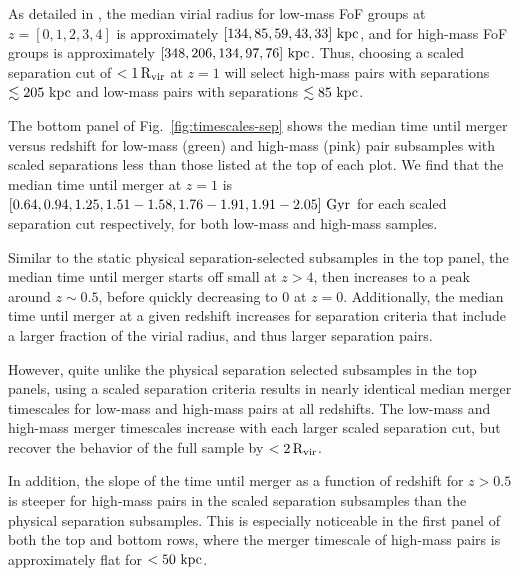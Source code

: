 \documentclass[twocolumn,linenumbers]{aastex631}
\newcommand{\kc}[1]{\textcolor{yellow}{\textbf{kc: #1}} }
\newcommand{\chambe}{\citet{Chamberlain2024}}
\begin{document}
        As detailed in \chambe{}, the median virial radius for low-mass FoF groups at $z=[0,1,2,3,4]$ is approximately $[134, 85, 59, 43, 33]\,\mathrm{\,kpc}$, and for high-mass FoF groups is approximately $[348, 206, 134, 97, 76]\,\mathrm{\,kpc}$.
        Thus, choosing a scaled separation cut of $<1\,\rm R_{vir}$ at $z=1$ will select high-mass pairs with separations $\lesssim205\,\mathrm{\,kpc}$ and low-mass pairs with separations $\lesssim85\,\mathrm{\,kpc}$.
        
        The bottom panel of Fig.~\ref{fig:timescales-sep} shows the median time until merger versus redshift for low-mass (green) and high-mass (pink) pair subsamples with scaled separations less than those listed at the top of each plot. 
        We find that the median time until merger at $z=1$ is $[0.64, 0.94,1.25,1.51-1.58,1.76-1.91,1.91-2.05]\,\mathrm{\,Gyr}$ for each scaled separation cut respectively, for both low-mass and high-mass samples. %
        
        Similar to the static physical separation-selected subsamples in the top panel, the median time until merger starts off small at $z>4$, then increases to a peak around $z\sim0.5$, before quickly decreasing to 0 at $z=0$. 
        Additionally, the median time until merger at a given redshift increases for separation criteria that include a larger fraction of the virial radius, and thus larger separation pairs. 
        
        However, quite unlike the physical separation selected subsamples in the top panels, using a scaled separation criteria results in nearly identical median merger timescales for low-mass and high-mass pairs at all redshifts.
        The low-mass and high-mass merger timescales increase with each larger scaled separation cut, but recover the behavior of the full sample by $<2\,\rm R_{vir}$.
        
        In addition, the slope of the time until merger as a function of redshift for $z>0.5$ is steeper for high-mass pairs in the scaled separation subsamples than the physical separation subsamples.
        This is especially noticeable in the first panel of both the top and bottom rows, where the merger timescale of high-mass pairs is approximately flat for $<50\,\mathrm{\,kpc}$. 
    
    
\end{document}
